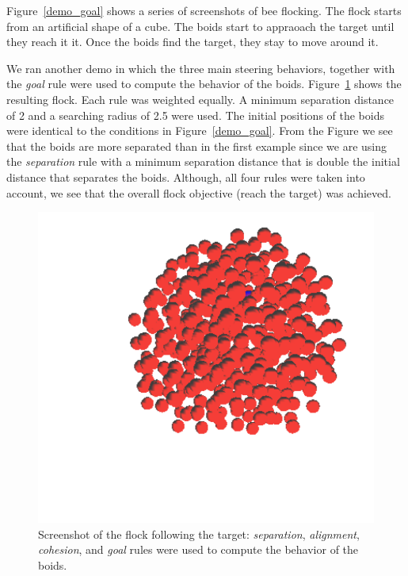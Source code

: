 Figure~\ref{demo_goal} shows a series of screenshots of bee flocking. The flock starts from an artificial shape of a cube. The boids start to appraoach the target until they reach it it. Once the boids find the target, they stay to move around it. 

We ran another demo in which the three main steering behaviors, together with the \textit{goal} rule were used to compute the behavior of the boids. Figure~\ref{goal_4rules} shows the resulting flock. Each rule was weighted equally. A minimum separation distance of 2 and a searching radius of 2.5 were used. The initial positions of the boids were identical to the conditions in Figure~\ref{demo_goal}. From the Figure we see that the boids are more separated than in the first example since we are using the \textit{separation} rule with a minimum separation distance that is double the initial distance that separates the boids. Although, all four rules were taken into account, we see that the overall flock objective (reach the target) was achieved. 

\begin{figure}[htbp]
\begin{center}
\includegraphics[scale=0.35]{figures/demo_goal_4rules.pdf}
\caption{Screenshot of the flock following the target: \textit{separation}, \textit{alignment}, \textit{cohesion}, and \textit{goal} rules were used to compute the behavior of the boids.}
\label{goal_4rules}
\end{center}
\end{figure}


